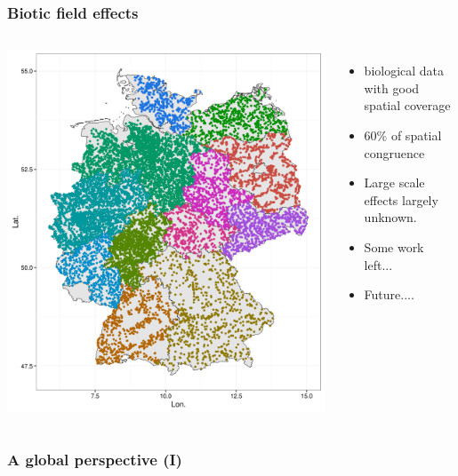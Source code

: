 \documentclass[
	10pt
	]{beamer}
\begin{document}
\begin{frame}
\frametitle{Biotic field effects}
	\begin{columns}
	    	    	\includegraphics[width=\textwidth, keepaspectratio]{figs/mzb_map.png}
	        \begin{itemize}
	        	\item biological data with good spatial coverage
	        	\item 60\% of spatial congruence 
	        	\item Large scale effects largely unknown.
	        	\item Some work left...
	        	\item Future....
	        \end{itemize}
	\end{columns}

\end{frame}

{%
\begin{frame}
\frametitle{A global perspective (I)}
	\begin{adjustbox}{max totalsize={\textwidth}{0.92\textheight}}
				
	\end{adjustbox}
\end{frame}
}
\end{document}
